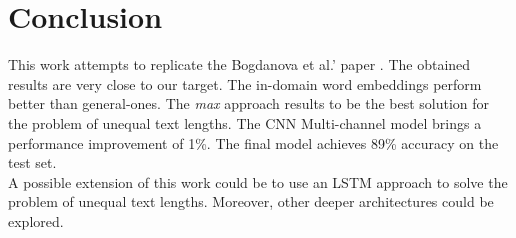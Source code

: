 \documentclass[10pt,twocolumn,letterpaper]{article}
\begin{document}
\section{Conclusion} 
This work attempts to replicate the Bogdanova et al.' paper \cite{bogdanova2015detecting}. The obtained results are very close to our target. The in-domain word embeddings perform better than general-ones. The \emph{max} approach results to be the best solution for the problem of unequal text lengths. The CNN Multi-channel model brings a performance improvement of 1\%. The final model achieves 89\% accuracy on the test set.\\
A possible extension of this work could be to use an LSTM approach to solve the problem of unequal text lengths. Moreover, other deeper architectures could be explored.





{\small


}
\end{document}

